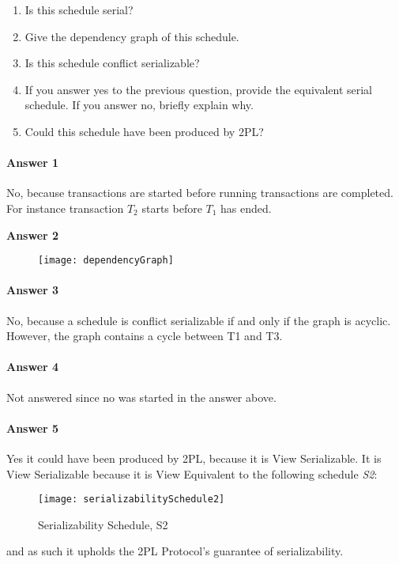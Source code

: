 \begin{enumerate}
	\item Is this schedule serial?
	\item  Give the dependency graph of this schedule.
	\item Is this schedule conflict serializable?
	\item  If you answer yes to the previous question, provide the equivalent serial schedule. If you answer no, brieﬂy explain why.
	\item Could this schedule have been produced by 2PL?
\end{enumerate}

\paragraph{Answer 1}
	No, because transactions are started before running transactions are completed. For instance transaction $T_2$ starts before $T_1$ has ended.
\pagebreak

\textbf{Answer 2}
\begin{figure}[H]
	\texttt{[image: dependencyGraph]}
	\label{Dependency Graph}
\end{figure}

\paragraph{Answer 3}
	No, because a schedule is conflict serializable if and only if the graph is acyclic. However, the graph contains a cycle between T1 and T3.
\paragraph{Answer 4}
	Not answered since no was started in the answer above.
\paragraph{Answer 5}
	Yes it could have been produced by 2PL, because it is View Serializable. It is View Serializable because it is View Equivalent to the following schedule \textit{S2}:
	\begin{figure}[H]
	\texttt{[image: serializabilitySchedule2]}
	\caption{Serializability Schedule, S2}
	\label{Serializability Schedule, S2}
\end{figure}
 and as such it upholds the 2PL Protocol's guarantee of serializability. 